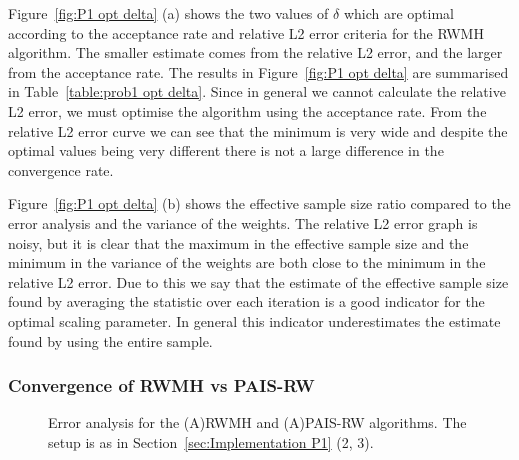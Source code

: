 \documentclass[final]{siamltex}
\begin{document}
Figure~\ref{fig:P1 opt delta} (a) shows the two values of $\delta$ which are optimal according to the acceptance rate and relative L2 error criteria for the RWMH algorithm. The smaller estimate comes from the relative L2 error, and the larger from the acceptance rate. The results in Figure~\ref{fig:P1 opt delta} are summarised in Table~\ref{table:prob1 opt delta}. Since in general we cannot calculate the relative L2 error, we must optimise the algorithm using the acceptance rate. From the relative L2 error curve we can see that the minimum is very wide and despite the optimal values being very different there is not a large difference in the convergence rate.

Figure~\ref{fig:P1 opt delta} (b) shows the effective sample size ratio compared to the error analysis and the variance of the weights. The relative L2 error graph is noisy, but it is clear that the maximum in the effective sample size and the minimum in the variance of the weights are both close to the minimum in the relative L2 error. Due to this we say that the estimate of the effective sample size found by averaging the statistic over each iteration is a good indicator for the optimal scaling parameter. In general this indicator underestimates the estimate found by using the entire sample.

\subsubsection{Convergence of RWMH vs PAIS-RW}

\begin{figure}[htb]
\centering
{}
\caption{Error analysis for the (A)RWMH and (A)PAIS-RW algorithms. The setup is as in Section~\ref{sec:Implementation P1} (2, 3).}
\label{fig:MH1 L2}
\end{figure}
\end{document}
